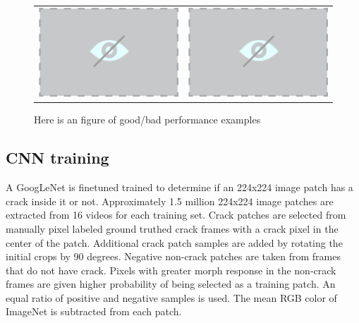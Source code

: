 \begin{figure}
    \begin{tabular}{c|c}
    \includegraphics[width=\columnwidth]{Images/NoVisualHolder.png} & \includegraphics[width=\columnwidth]{Images/NoVisualHolder.png}
    \end{tabular}
    \caption{Here is an figure of good/bad performance examples}
    \label{fig:FigExample}
\end{figure}

    \subsection{CNN training}
               A GoogLeNet is finetuned trained to determine if an 224x224 image patch has a crack inside it or not. Approximately 1.5 million 224x224 image patches are extracted from 16 videos for each training set. Crack patches are selected from manually pixel labeled ground truthed crack frames with a crack pixel in the center of the patch. Additional crack patch samples are added by rotating the initial crops by 90 degrees.  Negative non-crack patches are taken from frames that do not have crack. Pixels with greater morph response in the non-crack frames are given higher probability of being selected as a training patch. An equal ratio of positive and negative samples is used. The mean RGB color of ImageNet is subtracted from each patch.
               

